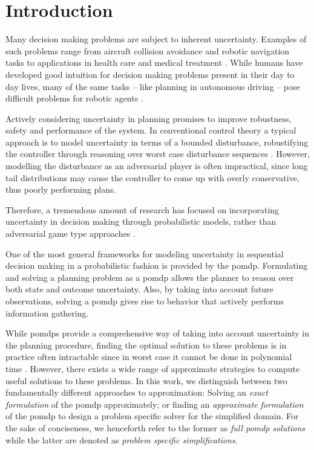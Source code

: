 \chapter{Introduction}\label{chap:introduction}

Many decision making problems are subject to inherent uncertainty. Examples of
such problems range from aircraft collision avoidance and robotic navigation
tasks to applications in health care and medical treatment
\cite{kochenderfer2012next, bandyopadhyay2013intention, pineau2003towards,
schaefer2005modeling}. While humans have developed good intuition for decision
making problems present in their day to day lives, many of the same tasks --
like planning in autonomous driving -- pose difficult problems for robotic
agents \cite{levinson2011towards}.

Actively considering uncertainty in planning promises to improve robustness,
safety and performance of the system. In conventional control theory a typical
approach is to model uncertainty in terms of a bounded disturbance,
robustifying the controller through reasoning over worst case disturbance
sequences \cite{petersen2012robust}. However, modelling the disturbance as an
adversarial player is often impractical, since long tail distributions may
cause the controller to come up with overly conservative, thus poorly
performing plans.

Therefore, a tremendous amount of research has focused on incorporating
uncertainty in decision making through probabilistic models, rather than
adversarial game type approaches \cite{roy1999coastal, amato2015planning,
fisac2018probabilistically, choudhury2019dynamic}.

One of the most general frameworks for modeling uncertainty in sequential
decision making in a probabilistic fashion is provided by the \ac{pomdp}.
Formulating and solving a planning problem as a \ac{pomdp} allows the planner
to reason over both state and outcome uncertainty. Also, by taking into account
future observations, solving a \ac{pomdp} gives rise to behavior that actively
performs information gathering.

While \acp{pomdp} provide a comprehensive way of taking into account
uncertainty in the planning procedure, finding the optimal solution to these
problems is in practice often intractable since in worst case it cannot be done
in polynomial time \cite{papadimitriou1987complexity}. However, there exists
a wide range of approximate strategies to compute useful solutions to these
problems. In this work, we distinguish between two fundamentally different
approaches to approximation: Solving an \emph{exact formulation} of the
\ac{pomdp} approximately; or finding an \emph{approximate formulation} of the
\ac{pomdp} to design a problem specific solver for the simplified domain. For
the sake of conciseness, we henceforth refer to the former as \emph{full
\ac{pomdp} solutions} while the latter are denoted as \emph{problem specific
simplifications}.

